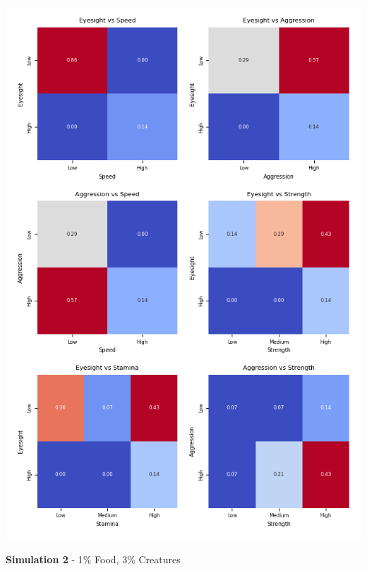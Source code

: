 \documentclass{article}
\begin{document}
\begin{center}
    \includegraphics[scale=0.9]{tests/2.1_confusion_matrices.png}
\end{center}
\textbf{Simulation 2} - 1\% Food, 3\% Creatures
\end{document}
